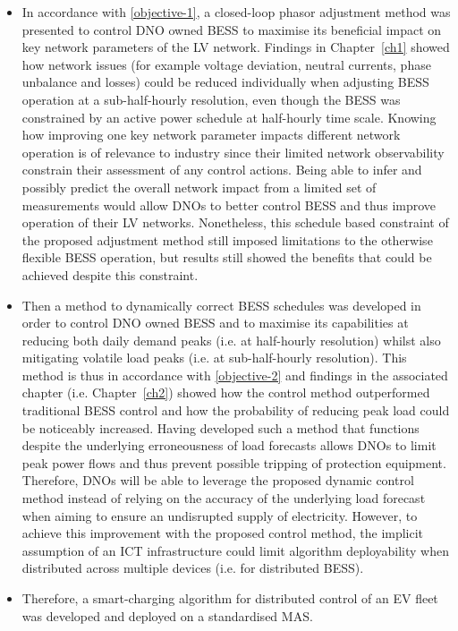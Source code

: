 \begin{itemize}
	\item
	In accordance with \ref{objective-1}, a closed-loop phasor adjustment method was presented to control DNO owned BESS to maximise its beneficial impact on key network parameters of the LV network.
	Findings in Chapter~\ref{ch1} showed how network issues (for example voltage deviation, neutral currents, phase unbalance and losses) could be reduced individually when adjusting BESS operation at a sub-half-hourly resolution, even though the BESS was constrained by an active power schedule at half-hourly time scale.
	Knowing how improving one key network parameter impacts different network operation is of relevance to industry since their limited network observability constrain their assessment of any control actions.
	Being able to infer and possibly predict the overall network impact from a limited set of measurements would allow DNOs to better control BESS and thus improve operation of their LV networks.
	Nonetheless, this schedule based constraint of the proposed adjustment method still imposed limitations to the otherwise flexible BESS operation, but results still showed the benefits that could be achieved despite this constraint.
	\item
	Then a method to dynamically correct BESS schedules was developed in order to control DNO owned BESS and to maximise its capabilities at reducing both daily demand peaks (i.e. at half-hourly resolution) whilst also mitigating volatile load peaks (i.e. at sub-half-hourly resolution).
	This method is thus in accordance with \ref{objective-2} and findings in the associated chapter (i.e. Chapter~\ref{ch2}) showed how the control method outperformed traditional BESS control and how the probability of reducing peak load could be noticeably increased.
	Having developed such a method that functions despite the underlying erroneousness of load forecasts allows DNOs to limit peak power flows and thus prevent possible tripping of protection equipment.
	Therefore, DNOs will be able to leverage the proposed dynamic control method instead of relying on the accuracy of the underlying load forecast when aiming to ensure an undisrupted supply of electricity.
	However, to achieve this improvement with the proposed control method, the implicit assumption of an ICT infrastructure could limit algorithm deployability when distributed across multiple devices (i.e. for distributed BESS).
	\item
	Therefore, a smart-charging algorithm for distributed control of an EV fleet was developed and deployed on a standardised MAS.

\end{itemize}
